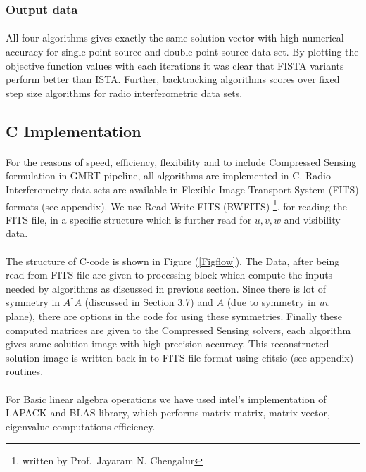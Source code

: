 \subsubsection{Output data}
\paragraph{}All four algorithms gives exactly the same solution vector with high numerical
accuracy for single point source and double point source data set. By plotting the objective 
function values with each iterations it was clear that FISTA variants perform better than 
ISTA. Further, backtracking algorithms scores over fixed step size algorithms for radio interferometric
data sets.

\subsection{C Implementation}
\label{s:implement_C}

\paragraph{}For the reasons of speed, efficiency, flexibility and to include 
Compressed Sensing formulation in GMRT pipeline, all algorithms are implemented in C.
Radio Interferometry data sets are available in Flexible Image Transport System 
(FITS) formats (see appendix). We use Read-Write FITS (RWFITS) \footnote{written by Prof.\ Jayaram N. Chengalur}.
for reading the FITS file, in a specific structure which is further read for 
$u,v,w$ and visibility data.

\paragraph{}The structure of C-code is shown in Figure (\ref{Figflow}). The Data, after being read 
from FITS file are given to processing block which compute the inputs needed by algorithms 
as discussed in previous section. Since there is lot of symmetry in $A^ \dagger A$ (discussed in Section 3.7)
 and $A$ (due to symmetry in $uv$ plane), there are options in the code for using these symmetries.
Finally these computed matrices are given to the Compressed Sensing solvers, each algorithm gives same solution image
with high precision accuracy. This reconstructed solution image is written back in to FITS file format using
cfitsio (see appendix) routines.

\paragraph{}For Basic linear algebra operations we have used intel's implementation of LAPACK and BLAS library,
which performs matrix-matrix, matrix-vector, eigenvalue computations efficiency.

